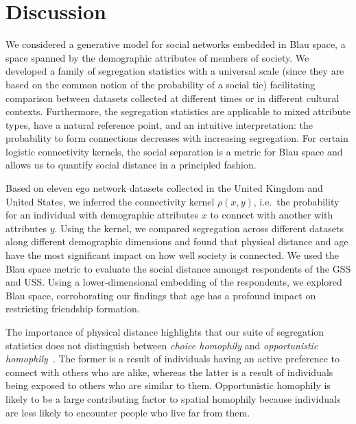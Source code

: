 \documentclass{scrartcl}
\begin{document}
\section{Discussion\label{sec:discussion}}

We considered a generative model for social networks embedded in Blau space, a space spanned by the demographic attributes of members of society. We developed a family of segregation statistics with a universal scale (since they are based on the common notion of the probability of a social tie) facilitating comparison between datasets collected at different times or in different cultural contexts. Furthermore, the segregation statistics are applicable to mixed attribute types, have a natural reference point, and an intuitive interpretation: the probability to form connections decreases with increasing segregation. For certain logistic connectivity kernels, the social separation is a metric for Blau space and allows us to quantify social distance in a principled fashion.

Based on eleven ego network datasets collected in the United Kingdom and United States, we inferred the connectivity kernel $\rho(x,y)$, i.e.\ the probability for an individual with demographic attributes $x$ to connect with another with attributes $y$. Using the kernel, we compared segregation across different datasets along different demographic dimensions and found that physical distance and age have the most significant impact on how well society is connected. We used the Blau space metric to evaluate the social distance amongst respondents of the GSS and USS. Using a lower-dimensional embedding of the respondents, we explored Blau space, corroborating our findings that age has a profound impact on restricting friendship formation.

The importance of physical distance highlights that our suite of segregation statistics does not distinguish between \emph{choice homophily} and \emph{opportunistic homophily}~\cite{Franz2010}. The former is a result of individuals having an active preference to connect with others who are alike, whereas the latter is a result of individuals being exposed to others who are similar to them. Opportunistic homophily is likely to be a large contributing factor to spatial homophily because individuals are less likely to encounter people who live far from them.
\end{document}
